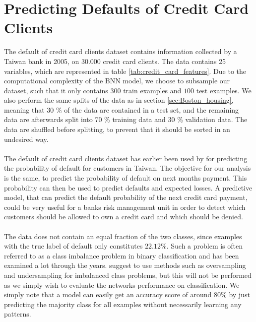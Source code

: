 \clearpage
\section{Predicting Defaults of Credit Card Clients} \label{sec:credit_default}
The default of credit card clients dataset contains information collected by a Taiwan bank in 2005, on $30.000$ credit card clients. The data contains 25 variables, which are represented in table \ref{tab:credit_card_features}. Due to the computational complexity of the BNN model, we choose to subsample our dataset, such that it only contains $300$ train examples and $100$ test examples. We also perform the same splits of the data as in section \ref{sec:Boston_housing}, meaning that 30 \% of the data are contained in a test set, and the remaining data are afterwards split into 70 \% training data and 30 \% validation data. The data are shuffled before splitting, to prevent that it should be sorted in an undesired way.
\\
\\
The default of credit card clients dataset has earlier been used by \cite{Yeh2009TheCO} for predicting the probability of default for customers in Taiwan. The objective for our analysis is the same, to predict the probability of default on next months payment. This probability can then be used to predict defaults and expected losses. A predictive model, that can predict the default probability of the next credit card payment, could be very useful for a banks risk management unit in order to detect which customers should be allowed to own a credit card and which should be denied. 
\\
\\
The data does not contain an equal fraction of the two classes, since examples with the true label of default only constitutes $22.12\%$. Such a problem is often referred to as a class imbalance problem in binary classification and has been examined a lot through the years. \cite{imbalane_danquah2020} suggest to use methods such as oversampling and undersampling for imbalanced class problems, but this will not be performed as we simply wish to evaluate the networks performance on classification. We simply note that a model can easily get an accuracy score of around $80\%$ by just predicting the majority class for all examples without necessarily learning any patterns. 



